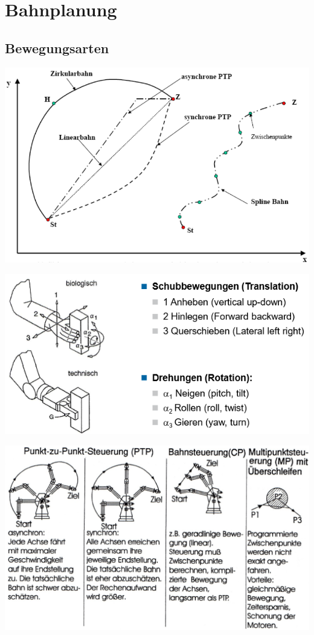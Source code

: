\section{Bahnplanung }
\subsection{Bewegungsarten }
\begin{minipage}{0.5\linewidth}
    \includegraphics[width=0.9\linewidth]{./bilder/bewegungsarten}
\end{minipage}
\begin{minipage}{0.5\linewidth}
    \includegraphics[width=\linewidth]{./bilder/BewegungGreifer}
\end{minipage}

\begin{minipage}{0.5\linewidth}
    \includegraphics[width=\linewidth]{./bilder/bewegungsarten2}
\end{minipage}


